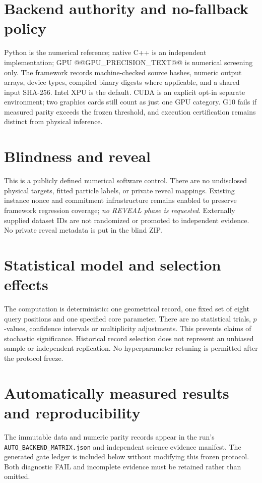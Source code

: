 \documentclass[11pt,a4paper]{article}
\begin{document}
\section{Backend authority and no-fallback policy}
Python is the numerical reference; native C++ is an independent implementation; GPU @@GPU_PRECISION_TEXT@@ is numerical screening only. The framework records machine-checked source hashes, numeric output arrays, device types, compiled binary digests where applicable, and a shared input SHA-256. Intel XPU is the default. CUDA is an explicit opt-in separate environment; two graphics cards still count as just one GPU category. G10 fails if measured parity exceeds the frozen threshold, and execution certification remains distinct from physical inference.
\section{Blindness and reveal}
This is a publicly defined numerical software control. There are no undisclosed physical targets, fitted particle labels, or private reveal mappings. Existing instance nonce and commitment infrastructure remains enabled to preserve framework regression coverage; \emph{no REVEAL phase is requested}. Externally supplied dataset IDs are not randomized or promoted to independent evidence. No private reveal metadata is put in the blind ZIP.
\section{Statistical model and selection effects}
The computation is deterministic: one geometrical record, one fixed set of eight query positions and one specified core parameter. There are no statistical trials, $p$-values, confidence intervals or multiplicity adjustments. This prevents claims of stochastic significance. Historical record selection does not represent an unbiased sample or independent replication. No hyperparameter retuning is permitted after the protocol freeze.
\section{Automatically measured results and reproducibility}
The immutable data and numeric parity records appear in the run's \texttt{AUTO\_BACKEND\_MATRIX.json} and independent science evidence manifest. The generated gate ledger is included below without modifying this frozen protocol. Both diagnostic FAIL and incomplete evidence must be retained rather than omitted.
\end{document}
